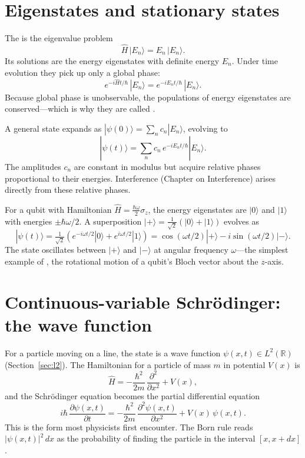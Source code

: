 \section{Eigenstates and stationary states}

The  is the eigenvalue problem
\[
  \hat H\,|E_n\rangle = E_n\,|E_n\rangle.
\]
Its solutions are the energy eigenstates with definite energy $E_n$. Under time evolution they pick up only a global phase:
\[
  e^{-i\hat H t/\hbar}\,|E_n\rangle = e^{-iE_n t/\hbar}\,|E_n\rangle.
\]
Because global phase is unobservable, the populations of energy eigenstates are conserved---which is why they are called .

A general state expands as $|\psi(0)\rangle = \sum_n c_n|E_n\rangle$, evolving to
\[
  |\psi(t)\rangle = \sum_n c_n\,e^{-iE_n t/\hbar}|E_n\rangle.
\]
The amplitudes $c_n$ are constant in modulus but acquire relative phases proportional to their energies. Interference (Chapter on Interference) arises directly from these relative phases.

\begin{example}
For a qubit with Hamiltonian $\hat H = \tfrac{\hbar\omega}{2}\sigma_z$, the energy eigenstates are $|0\rangle$ and $|1\rangle$ with energies $\pm\hbar\omega/2$. A superposition $|+\rangle = \tfrac{1}{\sqrt 2}(|0\rangle+|1\rangle)$ evolves as
\[
  |\psi(t)\rangle = \tfrac{1}{\sqrt 2}(e^{-i\omega t/2}|0\rangle + e^{i\omega t/2}|1\rangle) = \cos(\omega t/2)|+\rangle - i\sin(\omega t/2)|-\rangle.
\]
The state oscillates between $|+\rangle$ and $|-\rangle$ at angular frequency $\omega$---the simplest example of , the rotational motion of a qubit's Bloch vector about the $z$-axis.
\end{example}

\section{Continuous-variable Schr\"odinger: the wave function}

For a particle moving on a line, the state is a wave function $\psi(x,t) \in L^2(\mathbb{R})$ (Section~\ref{sec:l2}). The Hamiltonian for a particle of mass $m$ in potential $V(x)$ is
\[
  \hat H = -\frac{\hbar^2}{2m}\,\frac{\partial^2}{\partial x^2} + V(x),
\]
and the Schr\"odinger equation becomes the partial differential equation
\[
  i\hbar\,\frac{\partial\psi(x,t)}{\partial t} = -\frac{\hbar^2}{2m}\,\frac{\partial^2\psi(x,t)}{\partial x^2} + V(x)\,\psi(x,t).
\]
This is the form most physicists first encounter. The Born rule reads $|\psi(x,t)|^2\,dx$ as the probability of finding the particle in the interval $[x,x+dx]$.

